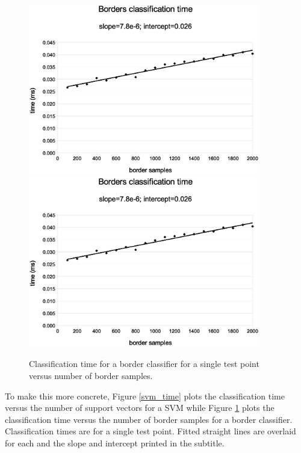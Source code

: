 \begin{figure}
  \ifsubmit
    \includegraphics[width=0.9\textwidth]{border_time}
  \else
    \includegraphics[width=0.9\textwidth]{../border_time}
  \fi
\caption{Classification time for a border classifier for a single test point versus number of border samples.}
\label{border_time}
\end{figure}

To make this more concrete, Figure \ref{svm_time}
plots the classification time versus the number of support vectors
for a SVM
while Figure \ref{border_time} plots the classification time
versus the number of border samples for a border classifier.
Classification times are for a single test point.
Fitted straight lines are overlaid for each and the slope and intercept 
printed in the subtitle.


